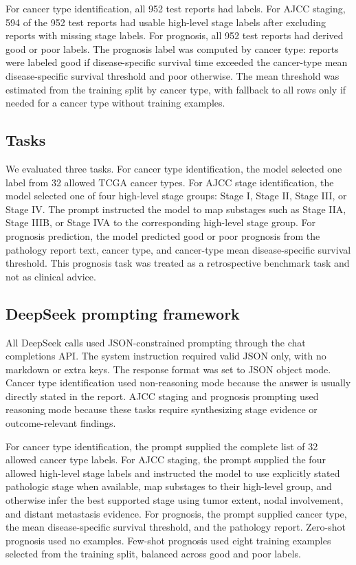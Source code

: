 \documentclass[pdflatex,sn-vancouver-num]{sn-jnl}
\begin{document}
For cancer type identification, all 952 test reports had labels. For AJCC staging, 594 of the 952 test reports had usable high-level stage labels after excluding reports with missing stage labels. For prognosis, all 952 test reports had derived good or poor labels. The prognosis label was computed by cancer type: reports were labeled good if disease-specific survival time exceeded the cancer-type mean disease-specific survival threshold and poor otherwise. The mean threshold was estimated from the training split by cancer type, with fallback to all rows only if needed for a cancer type without training examples.

\subsection{Tasks}\label{subsec:tasks}

We evaluated three tasks. For cancer type identification, the model selected one label from 32 allowed TCGA cancer types. For AJCC stage identification, the model selected one of four high-level stage groups: Stage I, Stage II, Stage III, or Stage IV. The prompt instructed the model to map substages such as Stage IIA, Stage IIIB, or Stage IVA to the corresponding high-level stage group. For prognosis prediction, the model predicted good or poor prognosis from the pathology report text, cancer type, and cancer-type mean disease-specific survival threshold. This prognosis task was treated as a retrospective benchmark task and not as clinical advice.

\subsection{DeepSeek prompting framework}\label{subsec:deepseek}

All DeepSeek calls used JSON-constrained prompting through the chat completions API. The system instruction required valid JSON only, with no markdown or extra keys. The response format was set to JSON object mode. Cancer type identification used non-reasoning mode because the answer is usually directly stated in the report. AJCC staging and prognosis prompting used reasoning mode because these tasks require synthesizing stage evidence or outcome-relevant findings.

For cancer type identification, the prompt supplied the complete list of 32 allowed cancer type labels. For AJCC staging, the prompt supplied the four allowed high-level stage labels and instructed the model to use explicitly stated pathologic stage when available, map substages to their high-level group, and otherwise infer the best supported stage using tumor extent, nodal involvement, and distant metastasis evidence. For prognosis, the prompt supplied cancer type, the mean disease-specific survival threshold, and the pathology report. Zero-shot prognosis used no examples. Few-shot prognosis used eight training examples selected from the training split, balanced across good and poor labels.
\end{document}
